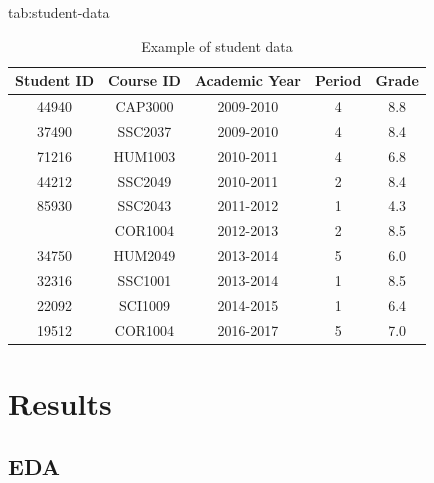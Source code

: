 \documentclass[wcp]{jmlr}%
\begin{document}
\begin{table}[hbtp]
	\floatconts
	{tab:student-data}
	{\caption{Example of student data}}	
	{\begin{tabular}{ccccc}
		\toprule
		\bfseries Student ID &\bfseries Course ID &\bfseries Academic Year &\bfseries Period &\bfseries Grade\\
		\midrule
		44940 & CAP3000 & 2009-2010 & 4 & 8.8\\
		37490 & SSC2037 & 2009-2010 & 4 & 8.4\\
		71216 & HUM1003 & 2010-2011 & 4 & 6.8\\
		44212 & SSC2049 & 2010-2011 & 2 & 8.4\\
		85930 & SSC2043 & 2011-2012 & 1 & 4.3\\
		\addlinespace
		14492 & COR1004 & 2012-2013 & 2 & 8.5\\
		34750 & HUM2049 & 2013-2014 & 5 & 6.0\\
		32316 & SSC1001 & 2013-2014 & 1 & 8.5\\
		22092 & SCI1009 & 2014-2015 & 1 & 6.4\\
		19512 & COR1004 & 2016-2017 & 5 & 7.0\\
		\bottomrule
	\end{tabular}}	
\end{table}


\section{Results}
\label{sec:results}


\subsection{EDA}
\end{document}
